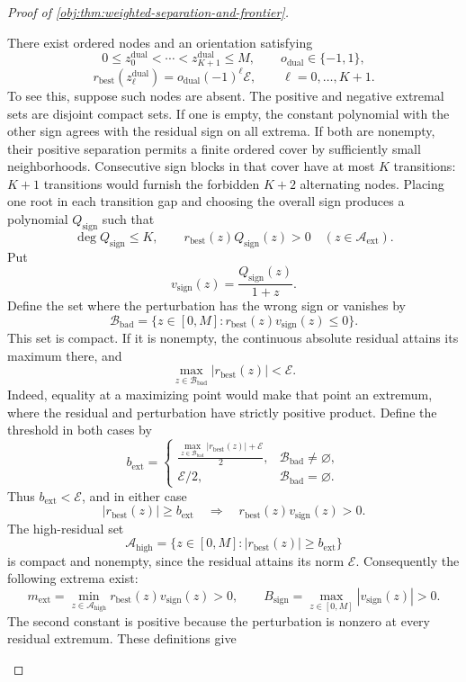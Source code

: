 \begin{proof}[Proof of \cref{obj:thm:weighted-separation-and-frontier}]
\begin{enumerate}
There exist ordered nodes and an orientation satisfying
\[
0\le z_0^{\mathrm{dual}}<\cdots<z_{K+1}^{\mathrm{dual}}\le M,
\qquad
o_{\mathrm{dual}}\in\{-1,1\},
\]
\[
r_{\mathrm{best}}(z_\ell^{\mathrm{dual}})
=o_{\mathrm{dual}}(-1)^\ell\mathcal E,
\qquad \ell=0,\ldots,K+1.
\]
To see this, suppose such nodes are absent. The positive and negative extremal sets are disjoint compact sets. If one is empty, the constant polynomial with the other sign agrees with the residual sign on all extrema. If both are nonempty, their positive separation permits a finite ordered cover by sufficiently small neighborhoods. Consecutive sign blocks in that cover have at most \(K\) transitions: \(K+1\) transitions would furnish the forbidden \(K+2\) alternating nodes. Placing one root in each transition gap and choosing the overall sign produces a polynomial \(Q_{\mathrm{sign}}\) such that
\[
\deg Q_{\mathrm{sign}}\le K,
\qquad
r_{\mathrm{best}}(z)Q_{\mathrm{sign}}(z)>0
\quad(z\in\mathcal A_{\mathrm{ext}}).
\]
Put
\[
v_{\mathrm{sign}}(z)=\frac{Q_{\mathrm{sign}}(z)}{1+z}.
\]
Define the set where the perturbation has the wrong sign or vanishes by
\[
\mathcal B_{\mathrm{bad}}
=\{z\in[0,M]:r_{\mathrm{best}}(z)v_{\mathrm{sign}}(z)\le0\}.
\]
This set is compact. If it is nonempty, the continuous absolute residual attains its maximum there, and
\[
\max_{z\in\mathcal B_{\mathrm{bad}}}|r_{\mathrm{best}}(z)|<\mathcal E.
\]
Indeed, equality at a maximizing point would make that point an extremum, where the residual and perturbation have strictly positive product. Define the threshold in both cases by
\[
b_{\mathrm{ext}}=
\begin{cases}
\displaystyle\frac{\max_{z\in\mathcal B_{\mathrm{bad}}}|r_{\mathrm{best}}(z)|+\mathcal E}{2},
&\mathcal B_{\mathrm{bad}}\ne\varnothing,\\[6pt]
\mathcal E/2,&\mathcal B_{\mathrm{bad}}=\varnothing.
\end{cases}
\]
Thus \(b_{\mathrm{ext}}<\mathcal E\), and in either case
\[
|r_{\mathrm{best}}(z)|\ge b_{\mathrm{ext}}
\quad\Longrightarrow\quad
r_{\mathrm{best}}(z)v_{\mathrm{sign}}(z)>0.
\]
The high-residual set
\[
\mathcal A_{\mathrm{high}}
=\{z\in[0,M]:|r_{\mathrm{best}}(z)|\ge b_{\mathrm{ext}}\}
\]
is compact and nonempty, since the residual attains its norm \(\mathcal E\). Consequently the following extrema exist:
\[
m_{\mathrm{ext}}
=\min_{z\in\mathcal A_{\mathrm{high}}}
 r_{\mathrm{best}}(z)v_{\mathrm{sign}}(z)>0,
\qquad
B_{\mathrm{sign}}
=\max_{z\in[0,M]}|v_{\mathrm{sign}}(z)|>0.
\]
The second constant is positive because the perturbation is nonzero at every residual extremum. These definitions give

\end{enumerate}
\end{proof}
